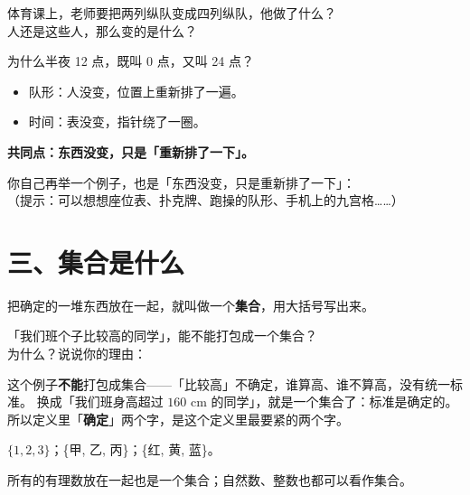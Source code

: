 \begin{sikao}
  体育课上，老师要把两列纵队变成四列纵队，他做了什么？\\[4pt]
  人还是这些人，那么变的是什么？
\end{sikao}

\begin{sikao}[例子二：半夜 12 点]
  为什么半夜 12 点，既叫 0 点，又叫 24 点？
\end{sikao}

\begin{example}[两个例子的共同点]
  \begin{itemize}
    \item 队形：人没变，位置上重新排了一遍。
    \item 时间：表没变，指针绕了一圈。
  \end{itemize}
  \textbf{共同点：东西没变，只是「重新排了一下」。}
\end{example}

\begin{sikao}[开放题]
  你自己再举一个例子，也是「东西没变，只是重新排了一下」：\\[4pt]
  （提示：可以想想座位表、扑克牌、跑操的队形、手机上的九宫格……）
\end{sikao}

\section*{三、集合是什么}

\begin{definition}[集合]
  把确定的一堆东西放在一起，就叫做一个\textbf{集合}，用大括号写出来。
\end{definition}

\begin{sikao}[一个不算集合的例子]
  「我们班个子比较高的同学」，能不能打包成一个集合？\\[4pt]
  为什么？说说你的理由：
\end{sikao}

\noindent 这个例子\textbf{不能}打包成集合——「比较高」不确定，谁算高、谁不算高，没有统一标准。
换成「我们班身高超过 \(160\) cm 的同学」，就是一个集合了：标准是确定的。
所以定义里「\textbf{确定}」两个字，是这个定义里最要紧的两个字。

\begin{example}
  \(\{1,2,3\}\)；\quad \{甲, 乙, 丙\}；\quad \{红, 黄, 蓝\}。

  所有的有理数放在一起也是一个集合；自然数、整数也都可以看作集合。
\end{example}

